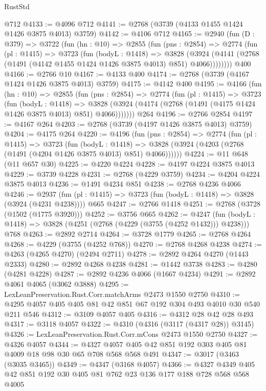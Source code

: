 \begin{lexlean}{RustStd}
\begin{coremodule}
    @712
@4133 := @4096 @712
@4141 := @2768 (@3739 (@4133 @1455 @1424 @1426 @3875 @4013) @3759)
@4142 := @4106 @712
@4165 := @2940
    (fun (D : @379) =>
    @3722
      (fun (hn : @10) =>
      @2855
        (fun (pns : @2854) =>
        @2774
          (fun (pl : @1415) =>
          @3723
            (fun (bodyL : @1418) =>
            @3828
              (@3924 (@4141 (@2768 (@1491 (@4142 @1455 @1424 @1426 @3875 @4013) @851) @4066))))))))
    @400
@4166 := @2766 @10
@4167 := @4133 @400
@4174 := @2768 (@3739 (@4167 @1424 @1426 @3875 @4013) @3759)
@4175 := @4142 @400
@4195 := @4166
    (fun (hn : @10) =>
    @2855
      (fun (pns : @2854) =>
      @2774
        (fun (pl : @1415) =>
        @3723
          (fun (bodyL : @1418) =>
          @3828 (@3924 (@4174 (@2768 (@1491 (@4175 @1424 @1426 @3875 @4013) @851) @4066)))))))
    @264
@4196 := @2766 @2854
@4197 := @4167 @264
@4203 := @2768 (@3739 (@4197 @1426 @3875 @4013) @3759)
@4204 := @4175 @264
@4220 := @4196
    (fun (pns : @2854) =>
    @2774
      (fun (pl : @1415) =>
      @3723
        (fun (bodyL : @1418) =>
        @3828 (@3924 (@4203 (@2768 (@1491 (@4204 @1426 @3875 @4013) @851) @4066))))))
@4224 := @11 @648 (@11 @657 @30)
@4225 := @4220 @4224
@4228 := @4197 @4224 @3875 @4013
@4229 := @3739 @4228
@4231 := @2768 (@4229 @3759)
@4234 := @4204 @4224 @3875 @4013
@4236 := @1491 @4234 @851
@4238 := @2768 @4236 @4066
@4246 := @2937 (fun (pl : @1415) => @3723 (fun (bodyL : @1418) => @3828 (@3924 (@4231 @4238)))) @665
@4247 := @2766 @1418
@4251 := @2768 (@3728 (@1502 (@1775 @3920)))
@4252 := @3756 @665
@4262 := @4247
    (fun (bodyL : @1418) => @3828 (@4251 (@2768 (@4229 (@3755 (@4252 @1432))) @4238)))
    @768
@4263 := @2892 @2714
@4264 := @3728 @1779
@4265 := @2768 @4264
@4268 := @4229 (@3755 (@4252 @768))
@4270 := @2768 @4268 @4238
@4274 := @4263 (@4265 @4270) (@2494 @2711)
@4278 := @2892 @4264 @4270 (@1443 @2333)
@4280 := @2892 @4268 @4238
@4281 := @1442 @3738
@4283 := @4280 (@4281 @4228)
@4287 := @2892 @4236 @4066 (@1667 @4234)
@4291 := @2892 @4061 @4065 (@3062 @3888)
@4295 := LexLeanPreservation.Rust.Corr.matchArms @2473 @1550 @2750
@4310 := @4295 @4057 @405 @405 @81 @42 @851 @67 @192 @304 @493 @4010 @30 @540 @211 @546
@4312 := @3109 @4057 @405
@4316 := @4312 @28 @42 @28 @493
@4317 := @3118 @4057
@4322 := @4310 (@4316 (@3117 (@4317 @28)) @3145)
@4326 := LexLeanPreservation.Rust.Corr.mCons @2473 @1550 @2750
@4327 := @4326 @4057
@4344 := @4327 @4057 @405 @42 @851 @192 @303 @405 @81 @4009 @18 @98 @30 @65 @708 @568 @568 @491
@4347 := @3017 (@3463 (@3035 @3465))
@4349 := @4347 (@3168 @4057)
@4366 := @4327 @4349 @405 @42 @851 @192 @30 @405 @81 @762 @23 @136 @177 @188 @728 @568 @568 @4005

\end{coremodule}
\end{lexlean}

